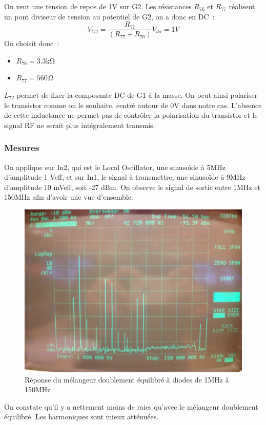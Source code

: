 \documentclass{article}
\begin{document}
On veut une tension de repos de 1V sur G2.
Les résistances $R_{76}$ et $R_{77}$ réalisent un pont diviseur de tension au potentiel de G2, on a donc en DC~:
\begin{equation*}
V_{G2}=\frac{R_{77}}{(R_{77}+R_{76})}V_{dd}=1V
\end{equation*}
On choisit donc~:
\begin{itemize}
\item $R_{76}= 3.3 \mathrm{k\Omega}$
\item $R_{77}= 560 \Omega$
\end{itemize}


$L_{72}$ permet de fixer la composante DC de G1 à la masse. On peut ainsi polariser le transistor comme on le souhaite, centré autour de 0V dans notre cas. L'absence de cette inductance ne permet pas de contrôler la polarisation du transistor et le signal RF ne serait plus intégralement transmis.

\subsubsection{Mesures}


On applique sur In2, qui est le Local Oscillator, une sinusoïde à 5MHz d'amplitude 1 Veff, et sur In1, le signal à transmettre, une sinusoïde à 9MHz d'amplitude 10 mVeff, soit -27 dBm.
On observe le signal de sortie entre 1MHz et 150MHz afin d'avoir une vue d'ensemble.
\begin{figure}[h!]
	\centering
	\includegraphics[width=.7\textwidth]{10_3_1}
	\caption{Réponse du mélangeur doublement équilibré à diodes de 1MHz à 150MHz}
	\label{fig:10_3_1}
\end{figure}

On constate qu'il y a nettement moins de raies qu'avec le mélangeur doublement équilibré. Les harmoniques sont mieux atténuées.
\end{document}
